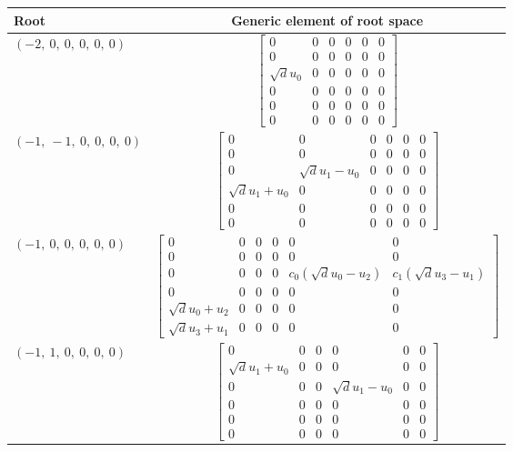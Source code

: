 \documentclass[11pt]{article}
\theoremstyle{definition}
\begin{document}
\bigskip

\noindent \begin{longtable}{|l|c|}
    \hline
    \textbf{Root} & \textbf{Generic element of root space} \\
    \hline
    \endhead
    $\left( -2, \  0, \  0, \  0, \  0, \  0\right)$ & ${\left[\begin{matrix}0 & 0 & 0 & 0 & 0 & 0\\0 & 0 & 0 & 0 & 0 & 0\\\sqrt{d} u_{0} & 0 & 0 & 0 & 0 & 0\\0 & 0 & 0 & 0 & 0 & 0\\0 & 0 & 0 & 0 & 0 & 0\\0 & 0 & 0 & 0 & 0 & 0\end{matrix}\right]}$ \\
    \hline
    $\left( -1, \  -1, \  0, \  0, \  0, \  0\right)$ & ${\left[\begin{matrix}0 & 0 & 0 & 0 & 0 & 0\\0 & 0 & 0 & 0 & 0 & 0\\0 & \sqrt{d} u_{1} - u_{0} & 0 & 0 & 0 & 0\\\sqrt{d} u_{1} + u_{0} & 0 & 0 & 0 & 0 & 0\\0 & 0 & 0 & 0 & 0 & 0\\0 & 0 & 0 & 0 & 0 & 0\end{matrix}\right]}$ \\
    \hline
    $\left( -1, \  0, \  0, \  0, \  0, \  0\right)$ & ${\left[\begin{matrix}0 & 0 & 0 & 0 & 0 & 0\\0 & 0 & 0 & 0 & 0 & 0\\0 & 0 & 0 & 0 & c_{0} \left(\sqrt{d} u_{0} - u_{2}\right) & c_{1} \left(\sqrt{d} u_{3} - u_{1}\right)\\0 & 0 & 0 & 0 & 0 & 0\\\sqrt{d} u_{0} + u_{2} & 0 & 0 & 0 & 0 & 0\\\sqrt{d} u_{3} + u_{1} & 0 & 0 & 0 & 0 & 0\end{matrix}\right]}$ \\
    \hline
    $\left( -1, \  1, \  0, \  0, \  0, \  0\right)$ & ${\left[\begin{matrix}0 & 0 & 0 & 0 & 0 & 0\\\sqrt{d} u_{1} + u_{0} & 0 & 0 & 0 & 0 & 0\\0 & 0 & 0 & \sqrt{d} u_{1} - u_{0} & 0 & 0\\0 & 0 & 0 & 0 & 0 & 0\\0 & 0 & 0 & 0 & 0 & 0\\0 & 0 & 0 & 0 & 0 & 0\end{matrix}\right]}$ \\

\end{longtable}
\end{document}
